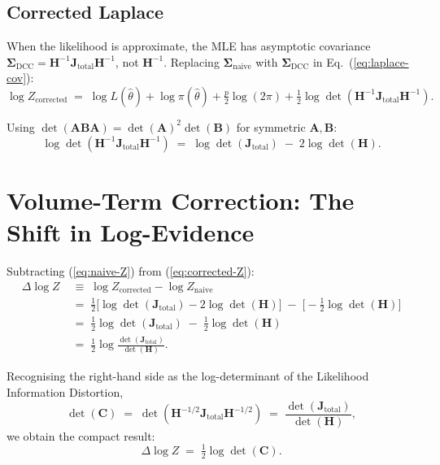\documentclass[11pt]{article}
\begin{document}
\subsection{Corrected Laplace}

When the likelihood is approximate, the MLE has asymptotic covariance $\boldsymbol\Sigma_{\mathrm{DCC}} = \mathbf H^{-1}\mathbf J_{\mathrm{total}}\mathbf H^{-1}$, not $\mathbf H^{-1}$. Replacing $\boldsymbol\Sigma_{\mathrm{naive}}$ with $\boldsymbol\Sigma_{\mathrm{DCC}}$ in Eq.~(\ref{eq:laplace-cov}):
\begin{equation}
\log Z_{\mathrm{corrected}}
\;=\;
\log L(\hat\theta)
+ \log\pi(\hat\theta)
+ \tfrac{p}{2}\log(2\pi)
+ \tfrac{1}{2}\log\det\!\left(\mathbf H^{-1}\mathbf J_{\mathrm{total}}\mathbf H^{-1}\right).
\label{eq:corrected-Z}
\end{equation}

Using $\det(\mathbf A\mathbf B\mathbf A) = \det(\mathbf A)^2 \det(\mathbf B)$ for symmetric $\mathbf A,\mathbf B$:
\begin{equation}
\log\det\!\left(\mathbf H^{-1}\mathbf J_{\mathrm{total}}\mathbf H^{-1}\right)
\;=\;
\log\det(\mathbf J_{\mathrm{total}})
\;-\;
2\log\det(\mathbf H).
\end{equation}

\section{Volume-Term Correction: The Shift in Log-Evidence}
\label{sec:shift-in-logZ}

Subtracting (\ref{eq:naive-Z}) from (\ref{eq:corrected-Z}):
\begin{align}
\Delta \log Z
\;&\equiv\;
\log Z_{\mathrm{corrected}} - \log Z_{\mathrm{naive}}
\\[4pt]
&=\;
\tfrac{1}{2}\bigl[\log\det(\mathbf J_{\mathrm{total}}) - 2\log\det(\mathbf H)\bigr]
\;-\;
\bigl[-\tfrac{1}{2}\log\det(\mathbf H)\bigr]
\\[4pt]
&=\;
\tfrac{1}{2}\log\det(\mathbf J_{\mathrm{total}})
\;-\;
\tfrac{1}{2}\log\det(\mathbf H)
\\[4pt]
&=\;
\tfrac{1}{2}\log\frac{\det(\mathbf J_{\mathrm{total}})}{\det(\mathbf H)}.
\end{align}

Recognising the right-hand side as the log-determinant of the Likelihood Information Distortion,
\begin{equation}
\det(\mathbf C)
\;=\;
\det\!\left(\mathbf H^{-1/2}\mathbf J_{\mathrm{total}}\mathbf H^{-1/2}\right)
\;=\;
\frac{\det(\mathbf J_{\mathrm{total}})}{\det(\mathbf H)},
\end{equation}
we obtain the compact result:
\begin{equation}
\boxed{\;
\Delta \log Z
\;=\;
\tfrac{1}{2}\log\det(\mathbf C).
\;}
\label{eq:main-result}
\end{equation}
\end{document}
